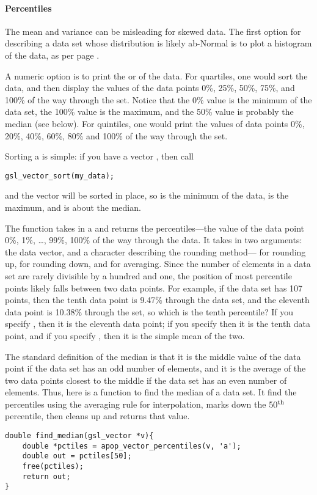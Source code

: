 \paragraph{Percentiles}  The mean and variance can be misleading for
skewed data. The first option for describing a data set whose
distribution is likely ab-Normal is to plot a histogram of the data, as
per page \pageref{histosec}.

A numeric option is to print the  or  of the
data. For quartiles, one would sort the data, and then display the 
values of the data points 0\%, 25\%, 50\%, 75\%, and 100\% of the
way through the set. Notice that the 0\% value is the minimum of the data
set, the 100\% value is the maximum, and the 50\% value is probably the
median (see below). For quintiles, one would print the
values of data points  0\%, 20\%, 40\%, 60\%, 80\% and 100\% of the way
through the set.

Sorting  a  is 
simple: if you have a vector , then call
\begin{lstlisting}
gsl_vector_sort(my_data);
\end{lstlisting}
and the vector will be sorted in place, so
 is the minimum of the data,
 is the maximum, and 
 is about the median.

The function  takes in a
 and returns the percentiles---the value of the
data point 0\%, 1\%, \dots, 99\%, 100\% of the way through the data.
It takes in two arguments: the data vector, and a character describing
the rounding method--- for rounding up,  for rounding
down, and  for averaging. Since the number of elements in a
data set are rarely divisible by a hundred and one, the position of most
percentile points likely falls between two data points. For example, if
the data set has 107 points, then the tenth data point is 9.47\% through
the data set, and the eleventh data point is 10.38\% through the set, so
which is the tenth percentile? If you specify , then it is the
eleventh data point; if you specify  then it is the tenth data
point, and if you specify , then it is the simple mean of the two.

The standard definition of the median is that it is the middle
value of the data point if the data set has an odd number of elements,
and it is the average of the two data points closest to the middle if
the data set has an even number of elements. 
Thus, here is a function to find the median of a data set. It find the
percentiles using the averaging rule for interpolation, marks down the
$50^{\rm th}$ percentile, then cleans up and returns that value.
\begin{lstlisting}
double find_median(gsl_vector *v){
    double *pctiles = apop_vector_percentiles(v, 'a');
    double out = pctiles[50];
    free(pctiles);
    return out;
}
\end{lstlisting}

